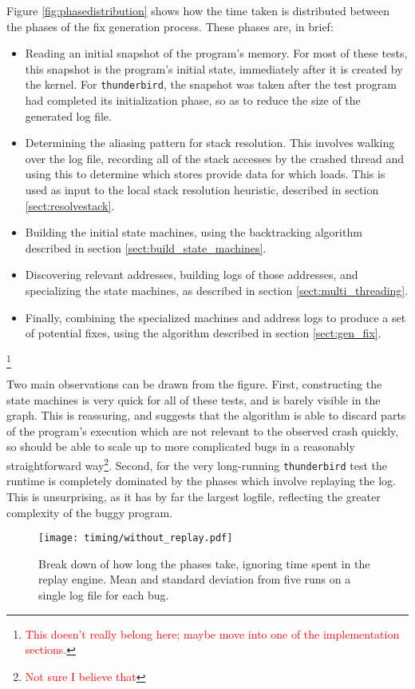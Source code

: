 \documentclass[10pt,twocolumn,preprint,natbib,authoryear]{sigplanconf}
\newcommand{\editorial}[1]{\textcolor{red}{\footnote{\textcolor{red}{#1}}}}
\begin{document}
Figure \ref{fig:phasedistribution} shows how the time taken is
distributed between the phases of the fix generation process.  These
phases are, in brief:

\begin{itemize}
\item Reading an initial snapshot of the program's memory.  For most
  of these tests, this snapshot is the program's initial state,
  immediately after it is created by the kernel.  For
  \verb|thunderbird|, the snapshot was taken after the test program
  had completed its initialization phase, so as to reduce the size of
  the generated log file.
\item Determining the aliasing pattern for stack resolution.  This
  involves walking over the log file, recording all of the stack
  accesses by the crashed thread and using this to determine which
  stores provide data for which loads.  This is used as input to the
  local stack resolution heuristic, described in section
  \ref{sect:resolvestack}.
\item Building the initial state machines, using the backtracking
  algorithm described in section \ref{sect:build_state_machines}.
\item Discovering relevant addresses, building logs of those
  addresses, and specializing the state machines, as described in
  section \ref{sect:multi_threading}.
\item Finally, combining the specialized machines and address logs to
  produce a set of potential fixes, using the algorithm described in
  section \ref{sect:gen_fix}.
\end{itemize}\editorial{This doesn't really belong here; maybe move into one of the implementation sections.}

Two main observations can be drawn from the figure.  First,
constructing the state machines is very quick for all of these tests,
and is barely visible in the graph.  This is reassuring, and suggests
that the algorithm is able to discard parts of the program's execution
which are not relevant to the observed crash quickly, so should be
able to scale up to more complicated bugs in a reasonably
straightforward way\editorial{Not sure I believe that}.  Second, for
the very long-running \verb|thunderbird| test the runtime is
completely dominated by the phases which involve replaying the log.
This is unsurprising, as it has by far the largest logfile, reflecting
the greater complexity of the buggy program.

\begin{figure*}
\texttt{[image: timing/without\_replay.pdf]}
\caption{Break down of how long the phases take, ignoring time spent
  in the replay engine.  Mean and standard deviation from five runs on
  a single log file for each bug.}
\label{fig:timesignoringreplay}
\end{figure*}
\end{document}
